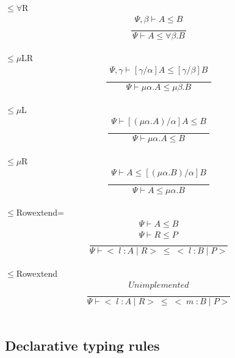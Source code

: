 \documentclass[12pt]{article}
\begin{document}
$\leq\forall$R \[\frac{
	\begin{array}{c}
	\Psi , \beta \vdash A \leq B \\
	\end{array}
}{
	\Psi \vdash A \leq \forall \beta . B
}\]\\
$\leq\mu$LR \[\frac{
	\begin{array}{c}
	\Psi , \gamma \vdash [\gamma / \alpha]A \leq [\gamma / \beta]B \\
	\end{array}
}{
	\Psi \vdash \mu \alpha . A \leq \mu \beta . B
}\]\\
$\leq\mu$L \[\frac{
	\begin{array}{c}
	\Psi  \vdash [(\mu \alpha . A) / \alpha]A \leq B \\
	\end{array}
}{
	\Psi \vdash \mu \alpha . A \leq B
}\]\\
$\leq\mu$R \[\frac{
	\begin{array}{c}
	\Psi  \vdash A \leq  [(\mu \alpha . B) / \alpha]B \\
	\end{array}
}{
	\Psi \vdash A \leq \mu \alpha . B
}\]\\
$\leq$Rowextend= \[\frac{
	\begin{array}{c}
	\Psi \vdash A \leq B \\
	\Psi \vdash R \leq P \\
	\end{array}
}{
	\Psi \vdash < \; l \; : A \; | \; R > \; \leq \; < \; l \; : B \; | \; P >
}\]\\
$\leq$Rowextend \[\frac{
	\begin{array}{c}
	Unimplemented \\
	\end{array}
}{
	\Psi \vdash < \; l \; : A \; | \; R > \; \leq \; < \; m \; : B \; | \; P >
}\]\\

\subsection{Declarative typing rules}
\end{document}
